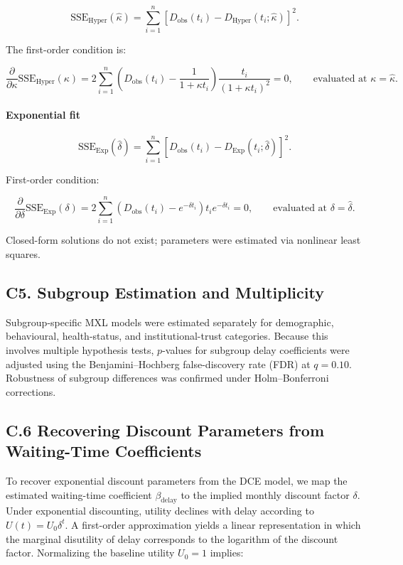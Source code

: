 \[
\mathrm{SSE}_{\text{Hyper}}(\hat{\kappa})
= \sum_{i=1}^{n}
\left[
D_{\text{obs}}(t_i)
- D_{\text{Hyper}}(t_i;\hat{\kappa})
\right]^2 .
\tag{C7}
\]


The first-order condition is:

\[
\frac{\partial}{\partial \kappa}
\mathrm{SSE}_{\text{Hyper}}(\kappa)
= 2 \sum_{i=1}^{n}
\left(
D_{\text{obs}}(t_i)
- \frac{1}{1 + \kappa t_i}
\right)
\frac{t_i}{(1 + \kappa t_i)^2}
= 0,
\qquad \text{evaluated at } \kappa = \hat{\kappa}.
\tag{C8}
\]


\paragraph{Exponential fit}

\[
\mathrm{SSE}_{\text{Exp}}(\hat{\delta})
= \sum_{i=1}^{n}
\left[
D_{\text{obs}}(t_i)
- D_{\text{Exp}}(t_i;\hat{\delta})
\right]^2 .
\tag{C9}
\]

First-order condition:

\[
\frac{\partial}{\partial \delta}
\mathrm{SSE}_{\text{Exp}}(\delta)
= 2 \sum_{i=1}^{n}
\left(
D_{\text{obs}}(t_i)
- e^{-\delta t_i}
\right)
t_i e^{-\delta t_i}
= 0,
\qquad \text{evaluated at } \delta = \hat{\delta}.
\tag{C10}
\]

Closed-form solutions do not exist; parameters were estimated via nonlinear least squares.

\subsection*{C5. Subgroup Estimation and Multiplicity}

Subgroup-specific MXL models were estimated separately for demographic, behavioural,
health-status, and institutional-trust categories. Because this involves multiple hypothesis tests,
$p$-values for subgroup delay coefficients were adjusted using the Benjamini–Hochberg
false-discovery rate (FDR) at $q = 0.10$. Robustness of subgroup differences was confirmed
under Holm–Bonferroni corrections.


\subsection*{C.6 Recovering Discount Parameters from Waiting-Time Coefficients}

To recover exponential discount parameters from the DCE model, we map the estimated 
waiting-time coefficient $\beta_{\text{delay}}$ to the implied monthly discount factor $\delta$. 
Under exponential discounting, utility declines with delay according to $U(t) = U_0 \delta^{t}$. A first-order approximation yields a linear representation in which 
the marginal disutility of delay corresponds to the logarithm of the discount factor. 
Normalizing the baseline utility $U_0 = 1$ implies:

